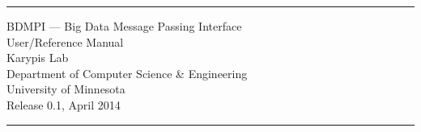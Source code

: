 \documentclass[twoside]{article}
\begin{document}
\hypersetup{pageanchor=false}
\begin{titlepage}
\vspace*{3cm}
\hrule
\begin{center}%
{\LARGE BDMPI --- Big Data Message Passing Interface}\\
\vspace*{0.5cm}
{\LARGE User/Reference Manual}\\
\vspace*{1cm}
{\Large Karypis Lab}\\
\vspace*{0.5cm}
{\Large Department of Computer Science \& Engineering}\\
\vspace*{0.5cm}
{\Large University of Minnesota}\\
\vspace*{0.5cm}
{\large Release 0.1, April 2014}\\
\end{center}
\hrule
\end{titlepage}
\tableofcontents
\clearpage
{}
\hypersetup{pageanchor=true}
\end{document}
